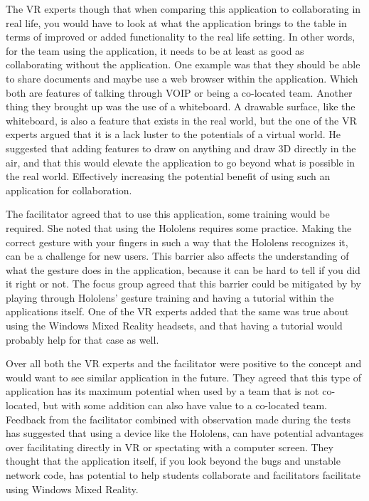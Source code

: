         The VR experts though that when comparing this application to collaborating in real life, you would have to look at what the application brings to the table in terms of improved or added functionality to the real life setting. In other words, for the team using the application, it needs to be at least as good as collaborating without the application. One example was that they should be able to share documents and maybe use a web browser within the application. Which both are features of talking through VOIP or being a co-located team. Another thing they brought up was the use of a whiteboard. A drawable surface, like the whiteboard, is also a feature that exists in the real world, but the one of the VR experts argued that it is a lack luster to the potentials of a virtual world. He suggested that adding features to draw on anything and draw 3D directly in the air, and that this would elevate the application to go beyond what is possible in the real world. Effectively increasing the potential benefit of using such an application for collaboration.
        
        The facilitator agreed that to use this application, some training would be required. She noted that using the Hololens requires some practice. Making the correct gesture with your fingers in such a way that the Hololens recognizes it, can be a challenge for new users. This barrier also affects the understanding of what the gesture does in the application, because it can be hard to tell if you did it right or not. The focus group agreed that this barrier could be mitigated by by playing through Hololens' gesture training and having a tutorial within the applications itself. One of the VR experts added that the same was true about using the Windows Mixed Reality headsets, and that having a tutorial would probably help for that case as well.
        
        Over all both the VR experts and the facilitator were positive to the concept and would want to see similar application in the future. They agreed that this type of application has its maximum potential when used by a team that is not co-located, but with some addition can also have value to a co-located team. Feedback from the facilitator combined with observation made during the tests has suggested that using a device like the Hololens, can have potential advantages over facilitating directly in VR or spectating with a computer screen. They thought that the application itself, if you look beyond the bugs and unstable network code, has potential to help students collaborate and facilitators facilitate using Windows Mixed Reality.
        
